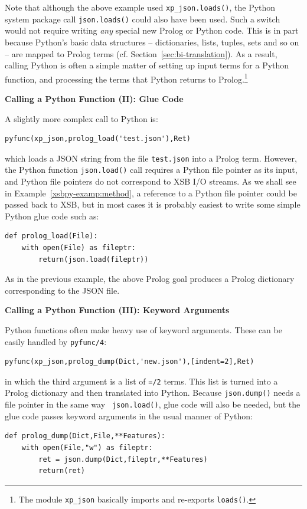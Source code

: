 Note that although the above example used {\tt xp\_json.loads()}, the
Python system package call {\tt json.loads()} could also have been
used.  Such a switch would not require writing {\em any} special
new Prolog or Python code.  This is in part because Python's basic data
structures -- dictionaries, lists, tuples, sets and so on -- are
mapped to Prolog terms (cf. Section~\ref{sec:bi-translation}).  As a
result, calling Python is often a simple matter of setting up input
terms for a Python function, and processing the terms that Python
returns to Prolog.\footnote{The module {\tt xp\_json} basically
  imports and re-exports {\tt loads()}.}

\begin{example} \rm {\bf Calling a Python Function (II): Glue Code} \label{xsbpy-examp:glue}

\noindent
  A slightly more complex call to Python is:
 \begin{verbatim}
pyfunc(xp_json,prolog_load('test.json'),Ret)
\end{verbatim}

\noindent
which loads a JSON string from the file {\tt test.json} into a Prolog
term.  However, the Python function {\tt json.load()} call requires a
Python file pointer as its input, and Python file pointers do not
correspond to XSB I/O streams.  As we shall see in
Example~\ref{xsbpy-examp:method}, a reference to a Python file pointer
could be passed back to XSB, but in most cases it is probably easiest
to write some simple Python glue code such as:

\begin{verbatim}   
def prolog_load(File):
    with open(File) as fileptr:
        return(json.load(fileptr))
\end{verbatim}
\noindent
As in the previous example, the above Prolog goal produces a Prolog
dictionary corresponding to the JSON file.
\end{example}

\begin{example} \rm {\bf Calling a Python Function (III): Keyword Arguments}
  
\noindent
Python functions often make heavy use of keyword arguments.  These can
be easily handled by {\tt pyfunc/4}:
\begin{verbatim}
pyfunc(xp_json,prolog_dump(Dict,'new.json'),[indent=2],Ret)
\end{verbatim}

\noindent
in which the third argument is a list of {\tt =/2} terms.  This list
is turned into a Prolog dictionary and then translated into Python.
Because {\tt json.dump()} needs a file pointer in the same way {\tt
  json.load()}, glue code will also be needed, but the glue code passes
keyword arguments in the usual manner of Python:
\begin{verbatim}
def prolog_dump(Dict,File,**Features):
    with open(File,"w") as fileptr:
        ret = json.dump(Dict,fileptr,**Features)
        return(ret)
\end{verbatim}
\end{example}

